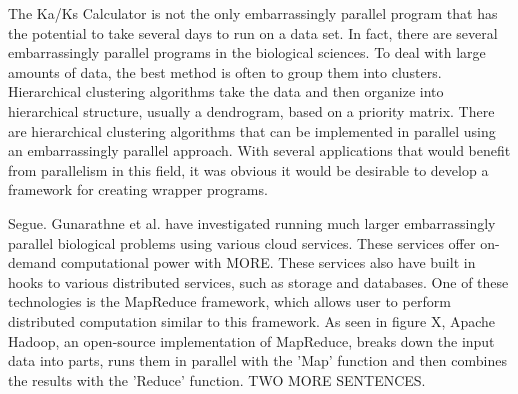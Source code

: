 \documentclass[12pt]{article}
\begin{document}
The Ka/Ks Calculator is not the only embarrassingly parallel program that has the
potential to take several days to run on a data set. In fact, there are several
embarrassingly parallel programs in the biological sciences. To deal with large
amounts of data, the best method is often to group them into clusters. 
Hierarchical clustering algorithms take the data and then organize into
hierarchical structure, usually a dendrogram, based on a priority matrix. There 
are hierarchical clustering algorithms that can be implemented in parallel using
an embarrassingly parallel approach.  With several applications that would 
benefit from parallelism in this field, it was obvious it would be desirable to 
develop a framework for creating wrapper programs. \cite{cluster}

Segue. Gunarathne et al.\cite{cloud} have investigated running much larger
embarrassingly parallel biological problems using various cloud services. These
services offer on-demand computational power with MORE.
These services also have built in hooks to various distributed services, such as
storage and databases. One of these technologies is the MapReduce framework,
which allows user to perform distributed computation similar to this framework.
As seen in figure X, Apache Hadoop, an open-source implementation of MapReduce,
breaks down the input data into parts, runs them in parallel with the 'Map'
function and then combines the results with the 'Reduce' function. TWO MORE
SENTENCES.
\end{document}

